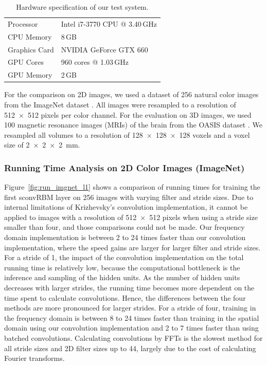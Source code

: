 \begin{table} 
\centering
\caption{Hardware specification of our test system.}
\label{tab:hardware}
\begin{tabular} {ll}
\toprule
Processor & Intel i7-3770 CPU @ 3.40\,GHz \\
CPU Memory & 8\,GB \\
\addlinespace
Graphics Card & NVIDIA GeForce GTX 660 \\
GPU Cores & 960 cores @ 1.03\,GHz \\
GPU Memory & 2\,GB \\
\bottomrule
\end{tabular}
\end{table}

For the comparison on 2D images, we used a dataset of 256 natural color images
from the ImageNet dataset \citep{deng2009}. All images were resampled to a resolution
of \num{512x512} pixels per color channel. For the evaluation on 3D images, we
used 100 magnetic resonance images (MRIs) of the brain from the OASIS dataset
\citep{Marcus2007}. We resampled all volumes to a resolution of
\num{128x128x128} voxels and a voxel size of \SI{2x2x2}{\milli\metre}.

\subsubsection{Running Time Analysis on 2D Color Images (ImageNet)}

Figure~\ref{fig:run_imgnet_l1} shows a comparison of running times for training
the first sconvRBM layer on 256 images with varying filter and stride sizes.
Due to internal limitations of Krizhevsky's convolution implementation, it
cannot be applied to images with a resolution of \num{512x512} pixels when using
a stride size smaller than four, and those comparisons could not be made. Our
frequency domain implementation is between 2 to 24 times faster than our
convolution implementation, where the speed gains are larger for larger filter
and stride sizes. For a stride of 1, the impact of the convolution
implementation on the total running time is relatively low, because the
computational bottleneck is the inference and sampling of the hidden
units.
As the number of hidden units decreases with larger strides, the running time
becomes more dependent on the time spent to calculate convolutions.
Hence, the differences between the four methods are more pronounced for larger
strides. For a stride of four, training in the frequency domain is between 8 to
24 times faster than training in the spatial domain using our convolution
implementation and 2 to 7 times faster than using batched convolutions.
Calculating convolutions by FFTs is the slowest method for all stride sizes and
2D filter sizes up to 44, largely due to the cost of calculating Fourier
transforms.

